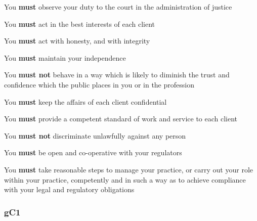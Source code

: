 \color{mygold}
\color{black}


 You \textcolor{myred}{\textbf{must}} observe your duty to the court in the
administration of justice


 You \textcolor{myred}{\textbf{must}} act in the best interests of each client


\cdsubsection{ \textbf{\textcolor{mygold}{CD3}}}

 You \textcolor{myred}{\textbf{must}} act with honesty, and with integrity 

\cdsubsection{ \textbf{\textcolor{mygold}{CD4}}}

 You \textcolor{myred}{\textbf{must}} maintain your independence 
 
\cdsubsection{ \textbf{\textcolor{mygold}{CD5}}}
 You \textcolor{myred}{\textbf{must not}} behave in a way which is likely to diminish the
trust and confidence which the public places in you or in the profession

\cdsubsection{ \textbf{\textcolor{mygold}{CD6}}}
 You \textcolor{myred}{\textbf{must}} keep the affairs of each client confidential


\cdsubsection{ \textbf{\textcolor{mygold}{CD7}}}

You \textcolor{myred}{\textbf{must}} provide a competent standard of work and service to
each client
\cdsubsection{ \textbf{\textcolor{mygold}{CD8}}}


 You \textcolor{myred}{\textbf{must not}} discriminate unlawfully against any person

\cdsubsection{ \textbf{\textcolor{mygold}{CD9}}}

 You \textcolor{myred}{\textbf{must}} be open and co-operative with your regulators


 You \textcolor{myred}{\textbf{must}} take reasonable steps to manage your practice, or
carry out your role within your practice, competently and in such a way
as to achieve compliance with your legal and regulatory obligations




\subsubsection{\color{darkgrey}gC1}

